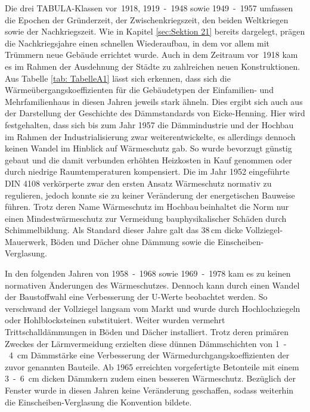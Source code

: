 Die drei TABULA-Klassen \mbox{vor 1918}, \mbox{1919 - 1948} sowie \mbox{1949 - 1957} umfassen die Epochen der Gründerzeit, der Zwischenkriegszeit, den beiden Weltkriegen sowie der Nachkriegszeit. 
Wie in Kapitel \ref{sec:Sektion 21} bereits dargelegt, prägen die Nachkriegsjahre einen schnellen Wiederaufbau, in dem vor allem mit Trümmern neue Gebäude errichtet wurde. 
Auch in dem Zeitraum \mbox{vor 1918} kam es im Rahmen der Ausdehnung der Städte zu zahlreichen neuen Konstruktionen. 
Aus Tabelle \ref{tab: TabelleA1} lässt sich erkennen, dass sich die Wärmeübergangskoeffizienten für die Gebäudetypen der Einfamilien- und Mehrfamilienhaus in diesen Jahren jeweils stark ähneln. 
Dies ergibt sich auch aus der Darstellung der Geschichte des Dämmstandards von Eicke-Henning. %
Hier wird festgehalten, dass sich bis zum Jahr 1957 die Dämmindustrie und der Hochbau im Rahmen der Industrialisierung zwar weiterentwickelte, es allerdings dennoch keinen Wandel im Hinblick auf Wärmeschutz gab.
So wurde bevorzugt günstig gebaut und die damit verbunden erhöhten Heizkosten in Kauf genommen oder durch niedrige Raumtemperaturen kompensiert.
Die im Jahr 1952 eingeführte DIN 4108 verkörperte zwar den ersten Ansatz Wärmeschutz normativ zu regulieren, jedoch konnte sie zu keiner Veränderung der energetischen Bauweise führen. 
Trotz deren Name \glqq Wärmeschutz im Hochbau\grqq\,beinhaltet die Norm nur einen Mindestwärmeschutz zur Vermeidung bauphysikalischer Schäden durch Schimmelbildung.
Als Standard dieser Jahre galt das 38\,cm dicke Vollziegel-Mauerwerk, Böden und Dächer ohne Dämmung sowie die Einscheiben-Verglasung. \cite{EickeHenning.2011}

In den folgenden Jahren von \mbox{1958 - 1968} sowie \mbox{1969 - 1978} kam es zu keinen normativen Änderungen des Wärmeschutzes. 
Dennoch kann durch einen Wandel der Baustoffwahl eine Verbesserung der U-Werte beobachtet werden. 
So verschwand der Vollziegel langsam vom Markt und wurde durch Hochlochziegeln oder Hohlblocksteinen substituiert.
Weiter wurden vermehrt Trittschalldämmungen in Böden und Dächer installiert. 
Trotz deren primären Zweckes der Lärmvermeidung erzielten diese dünnen Dämmschichten von \mbox{1 - 4 cm} Dämmstärke eine Verbesserung der Wärmedurchgangskoeffizienten der zuvor genannten Bauteile.
Ab 1965 erreichten vorgefertigte Betonteile mit einem \mbox{3 - 6 cm} dicken Dämmkern zudem einen besseren Wärmeschutz.
Bezüglich der Fenster wurde in diesen Jahren keine Veränderung geschaffen, sodass weiterhin die Einscheiben-Verglasung die Konvention bildete. \cite{EickeHenning.2011}

